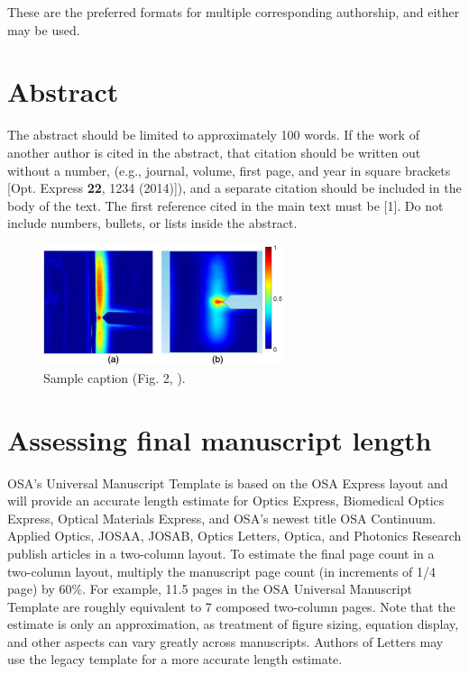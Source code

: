 \documentclass{osa-article}
\begin{document}
\address{Peer Review, Publications Department,
Optical Society of America, 2010 Massachusetts Avenue NW, Washington, DC 20036, USA\\
Publications Department, Optical Society of America, 2010 Massachusetts Avenue NW, Washington, DC 20036, USA\\
xyz@osa.org\\
opex@osa.org}
\medskip
These are the preferred
formats for multiple corresponding authorship, and either may be used.

\section{Abstract}
The abstract should be limited to approximately 100 words. If the work of another author is cited in the abstract, that citation should be written out without a number, (e.g., journal, volume, first page, and year in square brackets [Opt. Express {\bfseries 22}, 1234 (2014)]), and a separate citation should be included in the body of the text. The first reference cited in the main text must be [1]. Do not include numbers, bullets, or lists inside the abstract.

\begin{figure}[h!]
\centering\includegraphics[width=7cm]{osafig1}
\caption{Sample caption (Fig. 2, \cite{Yelin:03}).}
\end{figure}


\section{Assessing final manuscript length}
OSA's Universal Manuscript Template is based on the OSA Express layout and will provide an accurate length estimate for Optics Express, Biomedical Optics Express,  Optical Materials Express, and OSA's newest title OSA Continuum. Applied Optics, JOSAA, JOSAB, Optics Letters, Optica, and Photonics Research publish articles in a two-column layout. To estimate the final page count in a two-column layout, multiply the manuscript page count (in increments of 1/4 page) by 60\%. For example, 11.5 pages in the OSA Universal Manuscript Template are roughly equivalent to 7 composed two-column pages. Note that the estimate is only an approximation, as treatment of figure sizing, equation display, and other aspects can vary greatly across manuscripts. Authors of Letters may use the legacy template for a more accurate length estimate.
\end{document}
